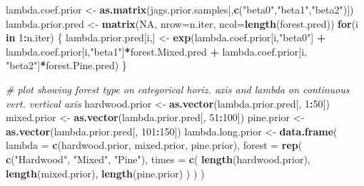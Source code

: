 \documentclass[
]{article}
\newenvironment{Shaded}{\begin{snugshade}}{\end{snugshade}}
\newcommand{\AttributeTok}[1]{\textcolor[rgb]{0.13,0.29,0.53}{#1}}
\newcommand{\CommentTok}[1]{\textcolor[rgb]{0.56,0.35,0.01}{\textit{#1}}}
\newcommand{\ConstantTok}[1]{\textcolor[rgb]{0.56,0.35,0.01}{#1}}
\newcommand{\ControlFlowTok}[1]{\textcolor[rgb]{0.13,0.29,0.53}{\textbf{#1}}}
\newcommand{\DecValTok}[1]{\textcolor[rgb]{0.00,0.00,0.81}{#1}}
\newcommand{\FunctionTok}[1]{\textcolor[rgb]{0.13,0.29,0.53}{\textbf{#1}}}
\newcommand{\NormalTok}[1]{#1}
\newcommand{\OtherTok}[1]{\textcolor[rgb]{0.56,0.35,0.01}{#1}}
\newcommand{\SpecialCharTok}[1]{\textcolor[rgb]{0.81,0.36,0.00}{\textbf{#1}}}
\newcommand{\StringTok}[1]{\textcolor[rgb]{0.31,0.60,0.02}{#1}}
\begin{document}
\begin{Shaded}
\begin{Highlighting}[]
\NormalTok{lambda.coef.prior }\OtherTok{\textless{}{-}} \FunctionTok{as.matrix}\NormalTok{(jags.prior.samples[,}\FunctionTok{c}\NormalTok{(}\StringTok{"beta0"}\NormalTok{,}\StringTok{"beta1"}\NormalTok{,}\StringTok{"beta2"}\NormalTok{)])}
\NormalTok{lambda.prior.pred }\OtherTok{\textless{}{-}} \FunctionTok{matrix}\NormalTok{(}\ConstantTok{NA}\NormalTok{, }\AttributeTok{nrow=}\NormalTok{n.iter, }\AttributeTok{ncol=}\FunctionTok{length}\NormalTok{(forest.pred))}
\ControlFlowTok{for}\NormalTok{(i }\ControlFlowTok{in} \DecValTok{1}\SpecialCharTok{:}\NormalTok{n.iter) \{}
\NormalTok{    lambda.prior.pred[i,] }\OtherTok{\textless{}{-}} \FunctionTok{exp}\NormalTok{(lambda.coef.prior[i,}\StringTok{"beta0"}\NormalTok{] }\SpecialCharTok{+}\NormalTok{ lambda.coef.prior[i,}\StringTok{"beta1"}\NormalTok{]}\SpecialCharTok{*}\NormalTok{forest.Mixed.pred }\SpecialCharTok{+}\NormalTok{ lambda.coef.prior[i, }\StringTok{"beta2"}\NormalTok{]}\SpecialCharTok{*}\NormalTok{forest.Pine.pred)}
\NormalTok{\}}

\CommentTok{\# plot showing forest type on categorical horiz. axis and lambda on continuous vert. vertical axis}
\NormalTok{hardwood.prior }\OtherTok{\textless{}{-}} \FunctionTok{as.vector}\NormalTok{(lambda.prior.pred[, }\DecValTok{1}\SpecialCharTok{:}\DecValTok{50}\NormalTok{])}
\NormalTok{mixed.prior    }\OtherTok{\textless{}{-}} \FunctionTok{as.vector}\NormalTok{(lambda.prior.pred[, }\DecValTok{51}\SpecialCharTok{:}\DecValTok{100}\NormalTok{])}
\NormalTok{pine.prior     }\OtherTok{\textless{}{-}} \FunctionTok{as.vector}\NormalTok{(lambda.prior.pred[, }\DecValTok{101}\SpecialCharTok{:}\DecValTok{150}\NormalTok{])}
\NormalTok{lambda.long.prior }\OtherTok{\textless{}{-}} \FunctionTok{data.frame}\NormalTok{(}
  \AttributeTok{lambda =} \FunctionTok{c}\NormalTok{(hardwood.prior, mixed.prior, pine.prior),}
  \AttributeTok{forest =} \FunctionTok{rep}\NormalTok{(}
    \FunctionTok{c}\NormalTok{(}\StringTok{"Hardwood"}\NormalTok{, }\StringTok{"Mixed"}\NormalTok{, }\StringTok{"Pine"}\NormalTok{),}
    \AttributeTok{times =} \FunctionTok{c}\NormalTok{(}
      \FunctionTok{length}\NormalTok{(hardwood.prior),}
      \FunctionTok{length}\NormalTok{(mixed.prior),}
      \FunctionTok{length}\NormalTok{(pine.prior)}
\NormalTok{    )}
\NormalTok{  )}
\NormalTok{)}


\end{Highlighting}
\end{Shaded}
\end{document}
